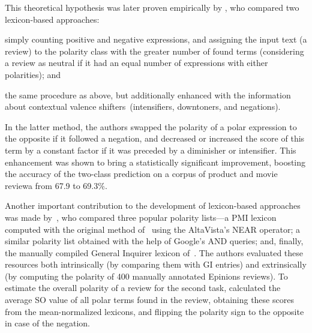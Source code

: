 This theoretical hypothesis was later proven empirically by
\citet{Kennedy:06}, who compared two lexicon-based approaches:
\begin{inparaenum}[(i)]
\item simply counting positive and negative expressions, and assigning
  the input text (a review) to the polarity class with the greater
  number of found terms (considering a review as neutral if it had an
  equal number of expressions with either polarities); and
\item the same procedure as above, but additionally enhanced with the
  information about contextual valence shifters~(intensifiers,
  downtoners, and negations).
\end{inparaenum}
In the latter method, the authors swapped the polarity of a polar
expression to the opposite if it followed a negation, and decreased or
increased the score of this term by a constant factor if it was
preceded by a diminisher or intensifier.  This enhancement was shown
to bring a statistically significant improvement, boosting the
accuracy of the two-class prediction on a corpus of product and movie
reviewa from 67.9 to 69.3\%.

Another important contribution to the development of lexicon-based
approaches was made by~\citet{Taboada:06}, who compared three popular
polarity lists---a PMI lexicon computed with the original method
of~\citet{Turney:02} using the AltaVista's NEAR operator; a similar
polarity list obtained with the help of Google's AND queries; and,
finally, the manually compiled General Inquirer lexicon
of~\citet{Stone:66}.  The authors evaluated these resources both
intrinsically (by comparing them with GI entries) and extrinsically
(by computing the polarity of 400 manually annotated Epinions
reviews).  To estimate the overall polarity of a review for the second
task, \citeauthor{Taboada:06} calculated the average SO value of all
polar terms found in the review, obtaining these scores from the
mean-normalized lexicons, and flipping the polarity sign to the
opposite in case of the negation.


